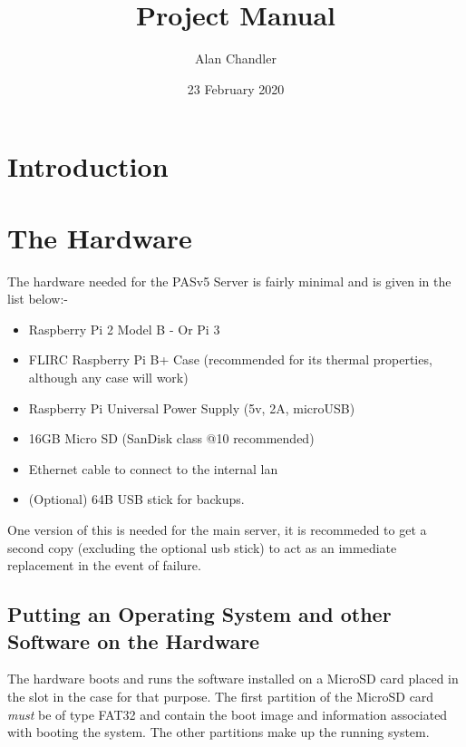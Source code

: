 \documentclass[Draft]{akc}
\author{Alan Chandler}
\title{Project Manual}
\date{23 February 2020}
\begin{document}
\maketitle
{}
\tableofcontents
\section{Introduction}

\section{The Hardware}

The hardware needed for the PASv5 Server is fairly minimal and is given in the list below:-

\begin{itemize}
\item Raspberry Pi 2 Model B - Or Pi 3
\item FLIRC Raspberry Pi B+ Case (recommended for its thermal properties, although any case will work)
\item Raspberry Pi Universal Power Supply (5v, 2A, microUSB)
\item 16GB Micro SD (SanDisk class @10 recommended)
\item Ethernet cable to connect to the internal lan
\item (Optional) 64B USB stick for backups.
\end{itemize}

One version of this is needed for the main server, it is recommeded to get a second copy (excluding
the optional usb stick) to act as an immediate replacement in the event of failure.

\subsection{Putting an Operating System and other Software on the Hardware}

The hardware boots and runs the software installed on a MicroSD card placed in the slot in the case
for that purpose.  The first partition of the MicroSD card \emph{must} be of type FAT32 and contain
the boot image and information associated with booting the system.  The other partitions make up the
running system.
\end{document}
